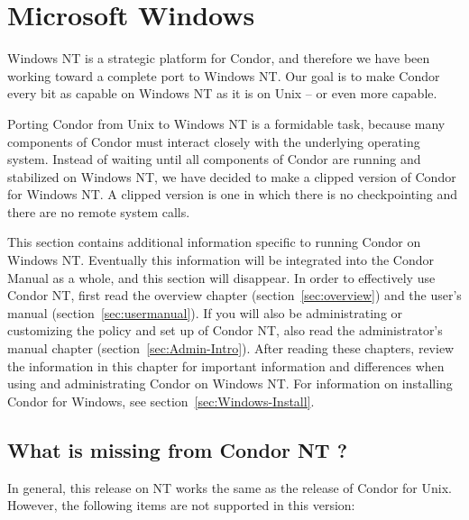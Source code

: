 \section{\label{sec:platform-windows}Microsoft Windows}

Windows NT is a strategic platform for Condor,
and therefore we have been working toward a complete
port to Windows NT.
Our goal is to make Condor every bit as capable on Windows NT as it is on
Unix -- or even more capable.  

Porting Condor from Unix to Windows NT is a formidable task,
because many
components of Condor must interact closely with the underlying operating
system.
Instead of waiting until all components of Condor are running
and stabilized on Windows NT,
we have decided to make a clipped version of Condor for Windows NT.
A clipped version is one in which there is no checkpointing
and there are no remote system calls.

This section contains additional information specific to running
Condor on Windows NT.  Eventually this information will be integrated
into the Condor Manual as a whole, and this section will disappear.
In order to effectively use Condor NT, first read the overview
chapter (section~\ref{sec:overview})
and the user's manual (section~\ref{sec:usermanual}).
If you will
also be administrating or customizing the policy and set up of Condor NT,
also read the administrator's manual 
chapter (section~\ref{sec:Admin-Intro}).
After reading these chapters,
review the information in this chapter for
important information and differences when using and administrating
Condor on Windows NT.
For information on installing Condor for Windows, see
section~\ref{sec:Windows-Install}.



\subsection{What is missing from Condor NT \VersionNotice?}

In general, this release on NT works the same as the 
release of Condor for Unix.  
However, the following items are not supported in this version:

